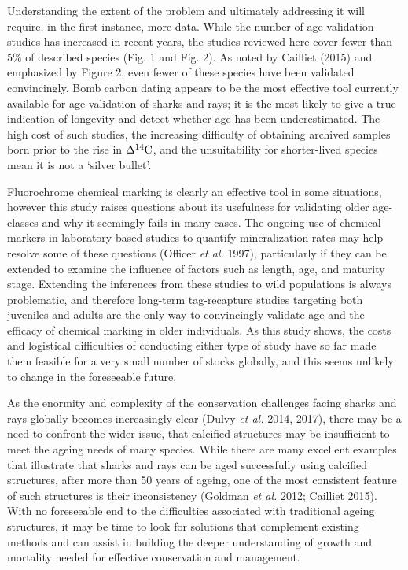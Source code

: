 \documentclass[]{article}
\begin{document}
Understanding the extent of the problem and ultimately addressing it
will require, in the first instance, more data. While the number of age
validation studies has increased in recent years, the studies reviewed
here cover fewer than 5\% of described species (Fig. 1 and Fig. 2). As
noted by Cailliet (2015) and emphasized by Figure 2, even fewer of these
species have been validated convincingly. Bomb carbon dating appears to
be the most effective tool currently available for age validation of
sharks and rays; it is the most likely to give a true indication of
longevity and detect whether age has been underestimated. The high cost
of such studies, the increasing difficulty of obtaining archived samples
born prior to the rise in \(\Delta^{14}\textup{C}\), and the
unsuitability for shorter-lived species mean it is not a `silver
bullet'.

Fluorochrome chemical marking is clearly an effective tool in some
situations, however this study raises questions about its usefulness for
validating older age-classes and why it seemingly fails in many cases.
The ongoing use of chemical markers in laboratory-based studies to
quantify mineralization rates may help resolve some of these questions
(Officer \emph{et al.} 1997), particularly if they can be extended to
examine the influence of factors such as length, age, and maturity
stage. Extending the inferences from these studies to wild populations
is always problematic, and therefore long-term tag-recapture studies
targeting both juveniles and adults are the only way to convincingly
validate age and the efficacy of chemical marking in older individuals.
As this study shows, the costs and logistical difficulties of conducting
either type of study have so far made them feasible for a very small
number of stocks globally, and this seems unlikely to change in the
foreseeable future.

As the enormity and complexity of the conservation challenges facing
sharks and rays globally becomes increasingly clear (Dulvy \emph{et al.}
2014, 2017), there may be a need to confront the wider issue, that
calcified structures may be insufficient to meet the ageing needs of
many species. While there are many excellent examples that illustrate
that sharks and rays can be aged successfully using calcified
structures, after more than 50 years of ageing, one of the most
consistent feature of such structures is their inconsistency (Goldman
\emph{et al.} 2012; Cailliet 2015). With no foreseeable end to the
difficulties associated with traditional ageing structures, it may be
time to look for solutions that complement existing methods and can
assist in building the deeper understanding of growth and mortality
needed for effective conservation and management.
\end{document}
